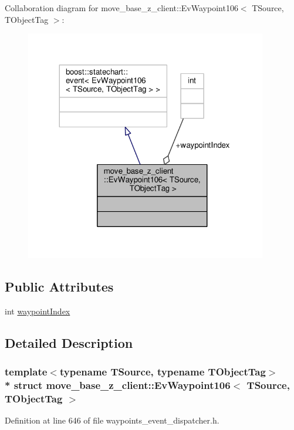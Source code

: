 Collaboration diagram for move\+\_\+base\+\_\+z\+\_\+client\+:\+:Ev\+Waypoint106$<$ T\+Source, T\+Object\+Tag $>$\+:\nopagebreak
\begin{figure}[H]
\begin{center}
\leavevmode
\includegraphics[width=299pt]{structmove__base__z__client_1_1EvWaypoint106__coll__graph}
\end{center}
\end{figure}
\subsection*{Public Attributes}
\begin{DoxyCompactItemize}
\item 
int \hyperlink{structmove__base__z__client_1_1EvWaypoint106_a616178f8e43992152d4537124eb4fe7d}{waypoint\+Index}
\end{DoxyCompactItemize}


\subsection{Detailed Description}
\subsubsection*{template$<$typename T\+Source, typename T\+Object\+Tag$>$\\*
struct move\+\_\+base\+\_\+z\+\_\+client\+::\+Ev\+Waypoint106$<$ T\+Source, T\+Object\+Tag $>$}



Definition at line 646 of file waypoints\+\_\+event\+\_\+dispatcher.\+h.



